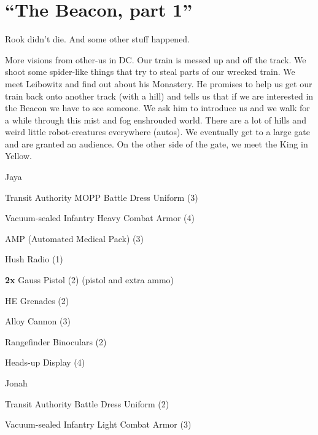 \setcounter{chapter}{ 39 }
\chapter{\textbf{``The Beacon, part 1''} }





Rook didn't die.  And some other stuff happened.



More visions from other-us in DC.  Our train is messed up and off the track.  We shoot some spider-like things that try to steal parts of our wrecked train.  We meet Leibowitz and find out about his Monastery.  He promises to help us get our train back onto another track (with a hill) and tells us that if we are interested in the Beacon we have to see someone.  We ask him to introduce us and we walk for a while through this mist and fog enshrouded world.  There are a lot of hills and weird little robot-creatures everywhere (autos).  We eventually get to a large gate and are granted an audience. On the other side of the gate, we meet the King in Yellow.





\noindent\hrulefill





Jaya

Transit Authority MOPP Battle Dress Uniform (3)

Vacuum-sealed Infantry Heavy Combat Armor (4) 

AMP (Automated Medical Pack) (3)

Hush Radio (1)

\textbf{2x} Gauss Pistol (2) (pistol and extra ammo)

HE Grenades (2)

Alloy Cannon (3)

Rangefinder Binoculars (2)

Heads-up Display (4)



Jonah

Transit Authority Battle Dress Uniform (2)

Vacuum-sealed Infantry Light Combat Armor (3)


